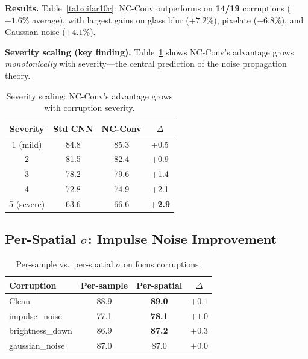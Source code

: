 \documentclass[runningheads]{llncs}
\begin{document}
\noindent\textbf{Results.}
Table~\ref{tab:cifar10c}: NC-Conv outperforms on \textbf{14/19} corruptions ($+1.6\%$ average), with largest gains on glass blur ($+7.2\%$), pixelate ($+6.8\%$), and Gaussian noise ($+4.1\%$).

\noindent\textbf{Severity scaling (key finding).}
Table~\ref{tab:severity} shows NC-Conv's advantage grows \emph{monotonically} with severity---the central prediction of the noise propagation theory.

\begin{table}[t]
\centering
\caption{Severity scaling: NC-Conv's advantage grows with corruption severity.}
\label{tab:severity}
\small
\begin{tabular}{@{}cccc@{}}
\toprule
\textbf{Severity} & \textbf{Std CNN} & \textbf{NC-Conv} & $\Delta$ \\
\midrule
1 (mild)   & 84.8 & 85.3 & +0.5 \\
2          & 81.5 & 82.4 & +0.9 \\
3          & 78.2 & 79.6 & +1.4 \\
4          & 72.8 & 74.9 & +2.1 \\
5 (severe) & 63.6 & 66.6 & \textbf{+2.9} \\
\bottomrule
\end{tabular}
\end{table}


\subsection{Per-Spatial $\sigma$: Impulse Noise Improvement}
\label{sec:perspatial_exp}

\begin{table}[t]
\centering
\caption{Per-sample vs.\ per-spatial $\sigma$ on focus corruptions.}
\label{tab:perspatial}
\small
\begin{tabular}{@{}lccc@{}}
\toprule
\textbf{Corruption} & \textbf{Per-sample} & \textbf{Per-spatial} & $\Delta$ \\
\midrule
Clean              & 88.9 & \textbf{89.0} & $+0.1$ \\
impulse\_noise     & 77.1 & \textbf{78.1} & $+1.0$ \\
brightness\_down   & 86.9 & \textbf{87.2} & $+0.3$ \\
gaussian\_noise    & 87.0 & 87.0 & $+0.0$ \\
\bottomrule
\end{tabular}
\end{table}
\end{document}
